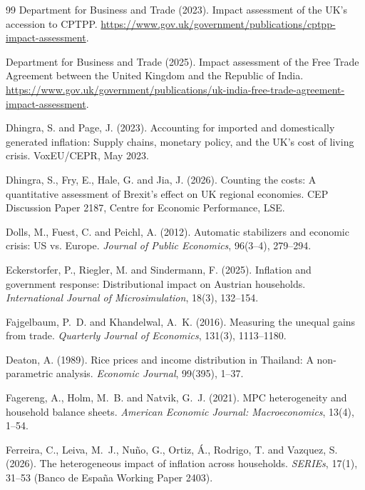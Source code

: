 \begin{thebibliography}{99}
Department for Business and Trade (2023).
\newblock Impact assessment of the UK's accession to CPTPP.
\newblock \url{https://www.gov.uk/government/publications/cptpp-impact-assessment}.

Department for Business and Trade (2025).
\newblock Impact assessment of the Free Trade Agreement between the United Kingdom and the Republic of India.
\newblock \url{https://www.gov.uk/government/publications/uk-india-free-trade-agreement-impact-assessment}.

Dhingra, S. and Page, J. (2023).
\newblock Accounting for imported and domestically generated inflation: Supply chains, monetary policy, and the UK's cost of living crisis.
\newblock VoxEU/CEPR, May 2023.

Dhingra, S., Fry, E., Hale, G. and Jia, J. (2026).
\newblock Counting the costs: A quantitative assessment of Brexit's effect on UK regional economies.
\newblock CEP Discussion Paper 2187, Centre for Economic Performance, LSE.

Dolls, M., Fuest, C. and Peichl, A. (2012).
\newblock Automatic stabilizers and economic crisis: US vs. Europe.
\newblock \emph{Journal of Public Economics}, 96(3--4), 279--294.

Eckerstorfer, P., Riegler, M. and Sindermann, F. (2025).
\newblock Inflation and government response: Distributional impact on Austrian households.
\newblock \emph{International Journal of Microsimulation}, 18(3), 132--154.

Fajgelbaum, P.~D. and Khandelwal, A.~K. (2016).
\newblock Measuring the unequal gains from trade.
\newblock \emph{Quarterly Journal of Economics}, 131(3), 1113--1180.

Deaton, A. (1989).
\newblock Rice prices and income distribution in Thailand: A non-parametric analysis.
\newblock \emph{Economic Journal}, 99(395), 1--37.

Fagereng, A., Holm, M.~B. and Natvik, G.~J. (2021).
\newblock MPC heterogeneity and household balance sheets.
\newblock \emph{American Economic Journal: Macroeconomics}, 13(4), 1--54.

Ferreira, C., Leiva, M.~J., Nu\~{n}o, G., Ortiz, \'A., Rodrigo, T. and Vazquez, S. (2026).
\newblock The heterogeneous impact of inflation across households.
\newblock \emph{SERIEs}, 17(1), 31--53 (Banco de Espa\~{n}a Working Paper 2403).


\end{thebibliography}
